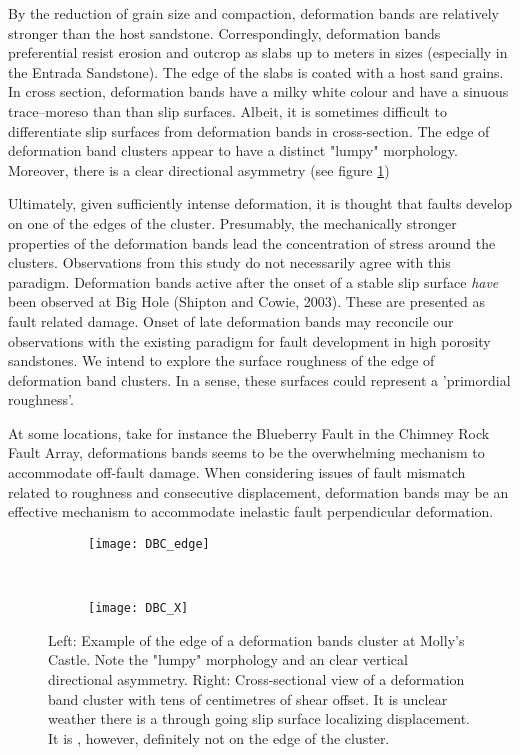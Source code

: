 \documentclass[12pt,a4paper]{article}
\begin{document}
By the reduction of grain size and compaction, deformation bands are relatively stronger than the host sandstone. Correspondingly, deformation bands preferential resist erosion and outcrop as slabs up to meters in sizes (especially in the Entrada Sandstone). The edge of the slabs is coated with a host sand grains. In cross section, deformation bands have a milky white colour and have a sinuous trace--moreso than than slip surfaces. Albeit, it is sometimes difficult to differentiate slip surfaces from deformation bands in cross-section. The edge of deformation band clusters appear to have a distinct "lumpy" morphology. Moreover, there is a clear directional asymmetry (see figure \ref{DBC})

Ultimately, given sufficiently intense deformation, it is thought that faults develop on one of the edges of the cluster. Presumably, the mechanically stronger properties of the deformation bands lead the concentration of stress around the clusters. Observations from this study do not necessarily agree with this paradigm. Deformation bands active after the onset of a stable slip surface \textit{have} been observed at Big Hole (Shipton and Cowie, 2003). These are presented as fault related damage. Onset of late deformation bands may reconcile our observations with the existing paradigm for fault development in high porosity sandstones. We intend to explore the surface roughness of the edge of deformation band clusters. In a sense, these surfaces could represent a 'primordial roughness'.

At some locations, take for instance the Blueberry Fault in the Chimney Rock Fault Array, deformations bands seems to be the overwhelming mechanism to accommodate off-fault damage. When considering issues of fault mismatch related to roughness and consecutive displacement, deformation bands may be an effective mechanism to accommodate inelastic fault perpendicular deformation.
 
 \begin{figure}[H]
	\centering
	\begin{subfigure}[b]{0.4\textwidth}
		\texttt{[image: DBC\_edge]}
	\end{subfigure}
	~
	\begin{subfigure}[b]{0.4\textwidth}
		\texttt{[image: DBC\_X]}
	\end{subfigure}
	\caption{Left: Example of the edge of a deformation bands cluster at Molly's Castle. Note the "lumpy" morphology and an clear vertical directional asymmetry. Right: Cross-sectional view of a deformation band cluster with tens of centimetres of shear offset. It is unclear weather there is a through going slip surface localizing displacement. It is , however, definitely not on the edge of the cluster.}
	\label{DBC}
\end{figure}		
\end{document}
